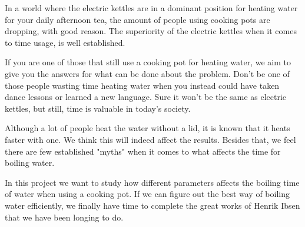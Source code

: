 In a world where the electric kettles are in a dominant position for heating water for your daily afternoon tea, the amount of people using cooking pots are dropping, with good reason. The superiority of the electric kettles when it comes to time usage, is well established.

If you are one of those that still use a cooking pot for heating water, we aim to give you the answers for what can be done about the problem. Don't be one of those people wasting time heating water when you instead could have taken dance lessons or learned a new language. Sure it won't be the same as electric kettles, but still, time is valuable in today's society.

Although a lot of people heat the water without a lid, it is known that it heats faster with one. We think this will indeed affect the results. Besides that, we feel there are few established "myths" when it comes to what affects the time for boiling water.

In this project we want to study how different parameters affects the boiling time of water when using a cooking pot. If we can figure out the best way of boiling water efficiently, we finally have time to complete the great works of Henrik Ibsen that we have been longing to do.